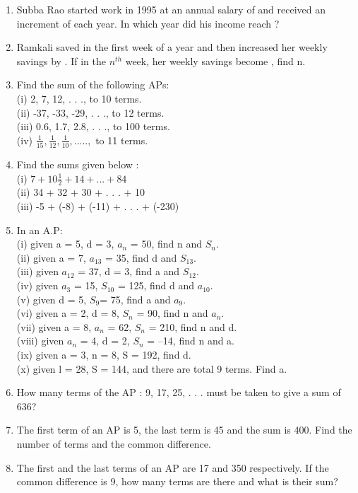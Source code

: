 \begin{enumerate}[label=\arabic*.,ref=\thesubsection.\theenumi]
\item Subba Rao started work in 1995 at an annual salary of  and received an increment of  each year. In which year did his income reach ?
\item Ramkali saved  in the first week of a year and then increased her weekly savings by . If in the $n^{th}$ week, her weekly savings become , find n.
\item Find the sum of the following APs:\\
(i) 2, 7, 12, . . ., to 10 terms.\\
(ii) -37, -33, -29, . . ., to 12 terms.\\
(iii) 0.6, 1.7, 2.8, . . ., to 100 terms.\\
(iv) $\frac{1}{15}, \frac{1}{12}, \frac{1}{10},.....,$ to 11 terms.
\item Find the sums given below :\\
(i) $7+10\frac{1}{2}+14+...+84$\\
(ii) 34 + 32 + 30 + . . . + 10\\
(iii) -5 + (-8) + (-11) + . . . + (-230)
\item In an A.P:\\
(i) given a = 5, d = 3, $a_n$ = 50, find n and $S_n.$\\
(ii) given a = 7, $a_{13}$ = 35, find d and $S_{13}.$\\
(iii) given $a_{12}$ = 37, d = 3, find a and $S_{12}.$\\
(iv) given $a_3$ = 15, $S_{10}$ = 125, find d and $a_{10}.$\\
(v) given d = 5, $S_9$= 75, find a and $a_9.$\\
(vi) given a = 2, d = 8, $S_n$ = 90, find n and $a_n.$\\
(vii) given a = 8, $a_n$ = 62, $S_n$ = 210, find n and d.\\
(viii) given $a_n$ = 4, d = 2, $S_n$ = –14, find n and a.\\
(ix) given a = 3, n = 8, S = 192, find d.\\
(x) given l = 28, S = 144, and there are total 9 terms. Find a.
\item How many terms of the AP : 9, 17, 25, . . . must be taken to give a sum of 636?
\item The first term of an AP is 5, the last term is 45 and the sum is 400. Find the number of terms and the common difference.
\item The first and the last terms of an AP are 17 and 350 respectively. If the common difference is 9, how many terms are there and what is their sum?

\end{enumerate}
